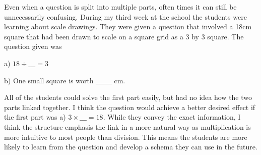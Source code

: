 \documentclass[11pt, a4paper, notitlepage]{article}
\begin{document}
\par
Even when a question is split into multiple parts, often times it can still be unnecessarily confusing. During my third week at the school the students were learning about scale drawings. They were given a question that involved a 18cm square that had been drawn to scale on a square grid as a 3 by 3 square. The question given was

  a) $18 \div \_\_\_= 3$ 

  b) One small square is worth \_\_\_ cm. 
  
All of the students could solve the first part easily, but had no idea how the two parts linked together. I think the question would achieve a better desired effect if the first part was a) $3\times\_\_\_ = 18$. While they convey the exact information, I think the structure emphasis the link in a more natural way as multiplication is more intuitive to most people than division. This means the students are more likely to learn from the question and develop a schema they can use in the future.
\end{document}
